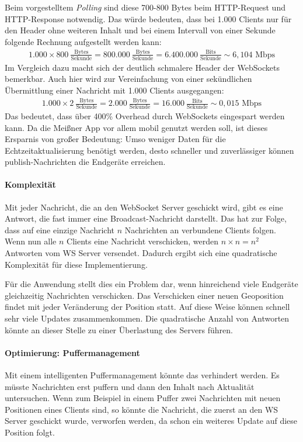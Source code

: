 Beim vorgestelltem \emph{Polling} sind diese 700-800 Bytes beim HTTP-Request und HTTP-Response notwendig. Das würde bedeuten, dass bei 1.000 Clients nur für den Header ohne weiteren Inhalt und bei einem Intervall von einer Sekunde folgende Rechnung aufgestellt werden kann:
\begin{align*}
	1.000 \times 800 \ \frac{\mbox{Bytes}}{\mbox{Sekunde}}= 800.000 \ \frac{\mbox{Bytes}}{\mbox{Sekunde}} = 6.400.000 \ \frac{\mbox{Bits}}{\mbox{Sekunde}} \sim 6,104 \mbox{ Mbps}
\end{align*}
Im Vergleich dazu macht sich der deutlich schmalere Header der WebSockets bemerkbar. Auch hier wird zur Vereinfachung von einer sekündlichen Übermittlung einer Nachricht mit 1.000 Clients ausgegangen:
\begin{align*}
	1.000 \times 2 \ \frac{\mbox{Bytes}}{\mbox{Sekunde}}= 2.000 \ \frac{\mbox{Bytes}}{\mbox{Sekunde}} = 16.000 \ \frac{\mbox{Bits}}{\mbox{Sekunde}} \sim 0,015 \mbox{ Mbps}
\end{align*}
Das bedeutet, dass über 400\% Overhead durch WebSockets eingespart werden kann. Da die Meißner App vor allem mobil genutzt werden soll, ist dieses Ersparnis von großer Bedeutung: Umso weniger Daten für die Echtzeitaktualisierung benötigt werden, desto schneller und zuverlässiger können publish-Nachrichten die Endgeräte erreichen.

\paragraph{Komplexität}
Mit jeder Nachricht, die an den WebSocket Server geschickt wird, gibt es eine Antwort, die fast immer eine Broadcast-Nachricht darstellt. Das hat zur Folge, dass auf eine einzige Nachricht $n$ Nachrichten an verbundene Clients folgen. Wenn nun alle $n$ Clients eine Nachricht verschicken, werden $n \times n = n^2$ Antworten vom WS Server versendet. Dadurch ergibt sich eine quadratische Komplexität für diese Implementierung.\par

Für die Anwendung stellt dies ein Problem dar, wenn hinreichend viele Endgeräte gleichzeitig Nachrichten verschicken. Das Verschicken einer neuen Geoposition findet mit jeder Veränderung der Position statt. Auf diese Weise können schnell sehr viele Updates zusammenkommen. Die quadratische Anzahl von Antworten könnte an dieser Stelle zu einer Überlastung des Servers führen.

\newpage
\paragraph{Optimierung: Puffermanagement}
Mit einem intelligenten Puffermanagement könnte das verhindert werden. Es müsste Nachrichten erst puffern und dann den Inhalt nach Aktualität untersuchen. Wenn zum Beispiel in einem Puffer zwei Nachrichten mit neuen Positionen eines Clients sind, so könnte die Nachricht, die zuerst an den WS Server geschickt wurde, verworfen werden, da schon ein weiteres Update auf diese Position folgt.

